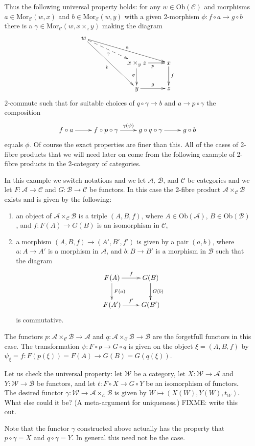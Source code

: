 \noindent
Thus the following universal property holds: for any
$w\in \text{Ob}(\mathcal{C})$ and morphisms 
$a \in \text{Mor}_{\mathcal C}(w,x)$ and 
$b \in \text{Mor}_{\mathcal{C}}(w,y)$ with a given 2-morphism
$\phi : f \circ a \to g\circ b$
there is a $\gamma \in \text{Mor}_{\mathcal C}(w,x\times_z y)$
making the diagram
$$
\xymatrix{
w\ar[rrrd]^a \ar@{-->}[rrd]_\gamma \ar[rrdd]_b &&\\
&&x\times_y z \ar[r]_{p} \ar[d]_{q} & x \ar[d]^{f} \\
&&y \ar[r]^{g} & z }
$$
2-commute such that for suitable choices of $q \circ \gamma \to b$
and $a \to p \circ \gamma$ the composition
$$
\xymatrix{
f \circ a \ar[r] &
f \circ p \circ \gamma \ar[r]^{\gamma(\psi)} &
g \circ q \circ \gamma \ar[r] &
g\circ b }
$$
equals $\phi$. Of course the exact properties are finer than this. All of the
cases of 2-fibre products that we will need later on come from the following
example of 2-fibre products in the 2-category of categories.

\begin{example}
\label{example-2-fibre-product-categories}
In this example we switch notations and we let $\mathcal{A}$, $\mathcal{B}$,
and $\mathcal{C}$ be categories and we let $F : \mathcal{A} \to \mathcal{C}$
and $G : \mathcal{B} \to \mathcal{C}$ be functors. In this case the 2-fibre
product $\mathcal{A}\times_\mathcal{C} \mathcal{B}$ exists and is given by
the following:
\begin{enumerate}
\item an object of $\mathcal{A}\times_\mathcal{C} \mathcal{B}$ is a triple
$(A,B,f)$, where $A\in \text{Ob}(\mathcal{A})$, $B\in \text{Ob}(\mathcal{B})$,
and $f : F(A) \to G(B)$ is an isomorphism in $\mathcal{C}$,
\item a morphism $(A,B,f) \to (A',B', f')$ is given by a pair $(a,b)$, where
$a : A \to A'$ is a morphism in $\mathcal{A}$, and $b : B \to B'$ is a
morphism in $\mathcal{B}$ such that the diagram 
$$
\xymatrix{
F(A) \ar[r]^f \ar[d]^{F(a)} & G(B) \ar[d]^{G(b)} \\
F(A') \ar[r]^{f'} & G(B')
}
$$
is commutative.
\end{enumerate}
The functors $p : \mathcal{A}\times_\mathcal{C}\mathcal{B} \to \mathcal{A}$
and $q : \mathcal{A}\times_\mathcal{C}\mathcal{B} \to \mathcal{B}$ are the
forgetfull functors in this case. The transformation $\psi : F \circ p \to
G \circ q$ is given on the object $\xi = (A,B,f)$ by
$\psi_\xi = f : F(p(\xi)) = F(A) \to G(B) = G(q(\xi))$.

\medskip\noindent
Let us check the universal property: let $\mathcal{W}$ be a category, let
$X : \mathcal{W} \to \mathcal{A}$ and $Y : \mathcal{W} \to \mathcal{B}$ be
functors, and let $t : F \circ X \to G \circ Y$ be an isomorphism of functors.
The desired functor $\gamma : \mathcal{W} \to
\mathcal{A}\times_\mathcal{C}\mathcal{B}$
is given by $W \mapsto (X(W), Y(W), t_W)$. What else could it be? 
(A meta-argument for uniqueness.) FIXME: write this out.

\medskip\noindent
Note that the functor $\gamma$ constructed above actually has the property
that $p \circ \gamma = X$ and $q \circ \gamma = Y$. In general this need not
be the case.
\end{example}

